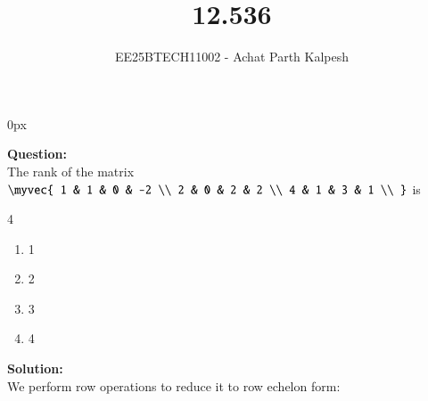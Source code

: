 \documentclass[journal]{IEEEtran}
\begin{document}

\title{12.536}
\author{EE25BTECH11002 - Achat Parth Kalpesh }
{\let\newpage\relax\maketitle}
\renewcommand{\thefigure}{\theenumi}
\renewcommand{\thetable}{\theenumi}
\setlength{\intextsep}{10pt} %
\renewcommand{\thetable}{\theenumi}
\parindent 0px



\textbf{Question:}\\
The rank of the matrix 
$
\myvec{
1 & 1 & 0 & -2 \\
2 & 0 & 2 & 2 \\
4 & 1 & 3 & 1 \\
}$
is

\begin{multicols}{4}
\begin{enumerate}
    \item 1
    \item 2
    \item 3
    \item 4
\end{enumerate}
\end{multicols}

\textbf{Solution:}\\
We perform row operations to reduce it to row echelon form:
\end{document}
